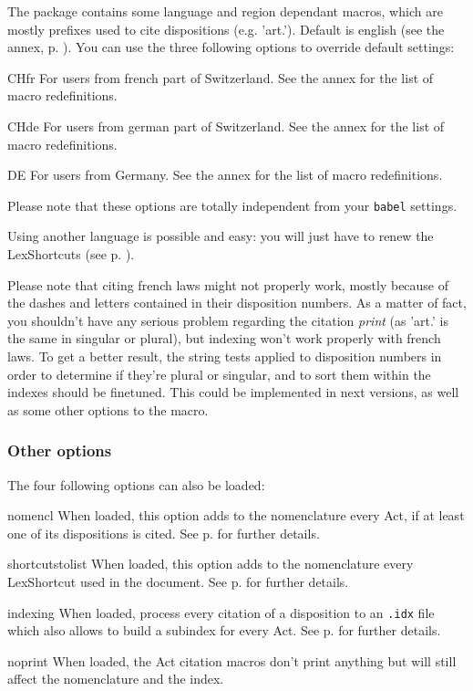 \documentclass[a4paper]{ltxdockit}[2011/03/25]
\begin{document}
The package contains some language and region dependant macros, which are mostly prefixes used to cite dispositions (e.g. 'art.'). Default is english (see the annex, p. \pageref{annex}). You can use the three following options to override default settings:

\begin{marglist}
\item[CHfr] For users from french part of Switzerland. See the annex for the list of macro redefinitions.
\item[CHde] For users from german part of Switzerland. See the annex for the list of macro redefinitions.
\item[DE] For users from Germany. See the annex for the list of macro redefinitions.
\end{marglist}

Please note that these options are totally independent from your \texttt{babel} settings.

Using another language is possible and easy: you will just have to renew the LexShortcuts (see p. \pageref{customization}).

Please note that citing french laws might not properly work, mostly because of the dashes and letters contained in their disposition numbers. As a matter of fact, you shouldn't have any serious problem regarding the citation \textit{print} (as 'art.' is the same in singular or plural), but indexing won't work properly with french laws. To get a better result, the string tests applied to disposition numbers in order to determine if they're plural or singular, and to sort them within the indexes should be finetuned. This could be implemented in next versions, as well as some other options to the  macro.

\subsubsection{Other options}

The four following options can also be loaded:

\begin{marglist}
\item[nomencl] When loaded, this option adds to the nomenclature every Act, if at least one of its dispositions is cited. See p. \pageref{nomenclature} for further details.
\item[shortcutstolist] When loaded, this option adds to the nomenclature every LexShortcut used in the document. See p. \pageref{nomenclature} for further details.
\item[indexing] When loaded, process every citation of a disposition to an \texttt{.idx} file which also allows to build a subindex for every Act. See p. \pageref{indexing} for further details.
\item[noprint] When loaded, the Act citation macros don't print anything but will still affect the nomenclature and the index.
\end{marglist}
\end{document}
